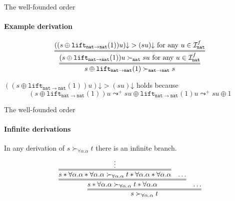 \documentclass[10pt,presentation,color=names]{beamer}
\newcommand{\Iterms}{\mathcal{I}}
\newcommand{\tapp}[2]{#1 * #2}
\newcommand{\nat}{\mathtt{nat}}
\newcommand{\lift}{\mathtt{lift}}
\newcommand{\da}{\mathord{\downarrow}}
\begin{document}
\begin{frame}{The well-founded order}
  \framesubtitle{Example derivation}
  \[
  \infer={s \oplus \lift_{\nat\to\nat}(1) \succ_{\nat\to\nat} s}{
    \infer={(s \oplus \lift_{\nat\to\nat}(1)) u \succ_\nat s u \text{ for any } u \in \Iterms^f_\nat}{
      ((s \oplus \lift_{\nat\to\nat}(1)) u)\da > (su)\da \text{ for any } u \in \Iterms^f_\nat
    }
  }
  \]

  \bigskip
  \pause

  $((s \oplus \lift_{\nat\to\nat}(1)) u)\da > (su)\da$ holds because
  \[
  (s \oplus \lift_{\nat\to\nat}(1)) u \leadsto^+ su \oplus \lift_{\nat\to\nat}(1) u \leadsto^+ su \oplus 1
  \]
\end{frame}

\begin{frame}{The well-founded order}
  \framesubtitle{Infinite derivations}
  In any derivation of $s \succ_{\forall\alpha . \alpha} t$ there is an infinite branch.
  \[
  \infer={s \succ_{\forall \alpha . \alpha} t}{
    \infer={\tapp{s}{\forall\alpha.\alpha} \succ_{\forall \alpha . \alpha} \tapp{t}{\forall\alpha.\alpha}}{
      \infer={\tapp{\tapp{s}{\forall\alpha.\alpha}}{
          \forall \alpha . \alpha} \succ_{\forall \alpha . \alpha}\tapp{\tapp{t}{\forall\alpha.\alpha}}{\forall\alpha.\alpha}}{\vdots} &
      \ldots} &
    \ldots
  }
  \]
\end{frame}
\end{document}
